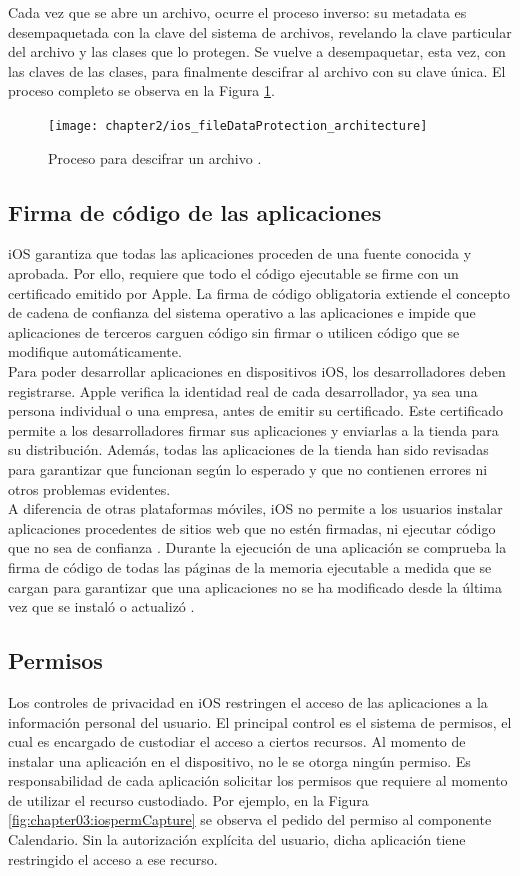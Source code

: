 Cada vez que se abre un archivo, ocurre el proceso inverso: su metadata es desempaquetada con la clave del sistema de archivos, revelando la clave particular del archivo y las clases que lo protegen. Se vuelve a desempaquetar, esta vez, con las claves de las clases, para finalmente descifrar al archivo con su clave única. El proceso completo se observa en la Figura \ref{fig:ch02:dataProtection}.
\begin{figure}[hbtp]
    \centering
    \texttt{[image: chapter2/ios\_fileDataProtection\_architecture]}
    \caption{Proceso para descifrar un archivo \cite{asg}.}
    \label{fig:ch02:dataProtection}
\end{figure}
\subsection{Firma de código de las aplicaciones}
iOS garantiza que todas las aplicaciones proceden de una fuente conocida y aprobada. Por ello, requiere que todo el código ejecutable se firme con un certificado emitido por Apple. La firma de código obligatoria extiende el concepto de cadena de confianza del sistema operativo a las aplicaciones e impide que aplicaciones de terceros carguen código sin firmar o utilicen código que se modifique automáticamente.\\

Para poder desarrollar aplicaciones en dispositivos iOS, los desarrolladores deben registrarse. Apple verifica la identidad real de cada desarrollador, ya sea una persona individual o una empresa, antes de emitir su certificado. Este certificado permite a los desarrolladores firmar sus aplicaciones y enviarlas a la tienda para su distribución. Además, todas las aplicaciones de la tienda han sido revisadas para garantizar que funcionan según lo esperado y que no contienen errores ni otros problemas evidentes.\\

A diferencia de otras plataformas móviles, iOS no permite a los usuarios instalar aplicaciones procedentes de sitios web que no estén firmadas, ni ejecutar código que no sea de confianza \cite{asg}. Durante la ejecución de una aplicación se comprueba la firma de código de todas las páginas de la memoria ejecutable a medida que se cargan para garantizar que una aplicaciones no se ha modificado desde la última vez que se instaló o actualizó \cite{asg}.
\subsection{Permisos}
Los controles de privacidad en iOS restringen el acceso de las aplicaciones a la información personal del usuario. El principal control es el sistema de permisos, el cual es encargado de custodiar el acceso a ciertos recursos. Al momento de instalar una aplicación en el dispositivo, no le se otorga ningún permiso. Es responsabilidad de cada aplicación solicitar los permisos que requiere al momento de utilizar el recurso custodiado. Por ejemplo, en la Figura \ref{fig:chapter03:iospermCapture} se observa el pedido del permiso al componente Calendario. Sin la autorización explícita del usuario, dicha aplicación tiene restringido el acceso a ese recurso.\\

